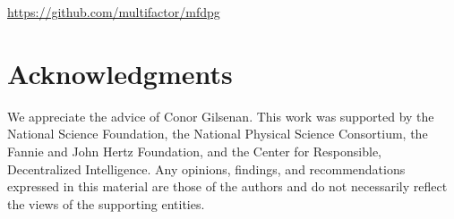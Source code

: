 \documentclass[conference]{IEEEtran}
\begin{document}
\centerline{\url{https://github.com/multifactor/mfdpg}}

\section*{Acknowledgments}
We appreciate the advice of Conor Gilsenan.
This work was supported by the National Science Foundation, the National Physical Science Consortium, the Fannie and John Hertz Foundation, and the Center for Responsible, Decentralized Intelligence. Any opinions, findings, and recommendations expressed in this material are those of the authors and do not necessarily reflect the views of the supporting entities.



\end{document}
